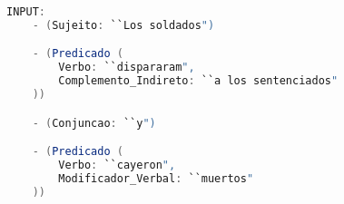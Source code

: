 \begin{center}
\begin{minipage}{14cm}
\begin{lstlisting}[language=java, basicstyle=\small, label={lst:example_complex_input}, caption=Example of a complex sentence input]
INPUT:
    - (Sujeito: ``Los soldados")

    - (Predicado (
        Verbo: ``dispararam",
        Complemento_Indireto: ``a los sentenciados"
    ))

    - (Conjuncao: ``y")

    - (Predicado (
        Verbo: ``cayeron",
        Modificador_Verbal: ``muertos"
    ))
\end{lstlisting}
\end{minipage}
\end{center}
